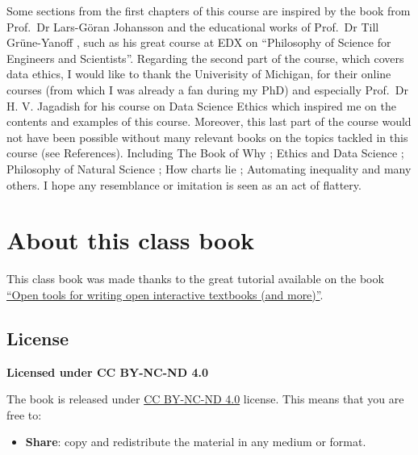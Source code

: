\documentclass[
]{book}
\providecommand{\tightlist}{%
  \setlength{\itemsep}{0pt}\setlength{\parskip}{0pt}}
\begin{document}
Some sections from the first chapters of this course are inspired by the book from Prof.~Dr Lars-Göran Johansson \citep{johansson2016philosophy} and the educational works of Prof.~Dr Till Grüne-Yanoff \citep{grune2014teaching}, such as his great course at EDX on ``Philosophy of Science for Engineers and Scientists''. Regarding the second part of the course, which covers data ethics, I would like to thank the Univerisity of Michigan, for their online courses (from which I was already a fan during my PhD) and especially Prof.~Dr H. V. Jagadish for his course on Data Science Ethics which inspired me on the contents and examples of this course. Moreover, this last part of the course would not have been possible without many relevant books on the topics tackled in this course (see References). Including The Book of Why \citep{book-of-why}; Ethics and Data Science \citep{loukides2018ethics}; Philosophy of Natural Science \citep{hempel-pos}; How charts lie \citep{cairo2019charts}; Automating inequality \citep{eubanks2018automating} and many others. I hope any resemblance or imitation is seen as an act of flattery.

\hypertarget{about-this-class-book}{%
\section*{About this class book}\label{about-this-class-book}}

This class book was made thanks to the great tutorial available on the book \href{https://www.crumplab.com/OER_bookdown}{``Open tools for writing open interactive textbooks (and more)''}.

\hypertarget{license}{%
\subsection*{License}\label{license}}

\textbf{Licensed under CC BY-NC-ND 4.0}

The book is released under \href{https://creativecommons.org/licenses/by-nc-nd/4.0/}{CC BY-NC-ND 4.0} license. This means that you are free to:

\begin{itemize}
\tightlist
\item
  \textbf{Share}: copy and redistribute the material in any medium or format.
\end{itemize}
\end{document}
